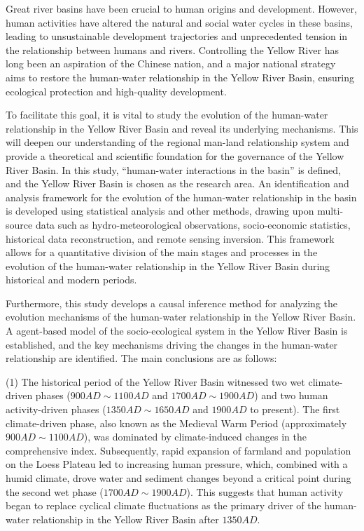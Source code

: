 \begin{eabstract}
  Great river basins have been crucial to human origins and development. However, human activities have altered the natural and social water cycles in these basins, leading to unsustainable development trajectories and unprecedented tension in the relationship between humans and rivers. Controlling the Yellow River has long been an aspiration of the Chinese nation, and a major national strategy aims to restore the human-water relationship in the Yellow River Basin, ensuring ecological protection and high-quality development.

  To facilitate this goal, it is vital to study the evolution of the human-water relationship in the Yellow River Basin and reveal its underlying mechanisms. This will deepen our understanding of the regional man-land relationship system and provide a theoretical and scientific foundation for the governance of the Yellow River Basin. In this study, ``human-water interactions in the basin'' is defined, and the Yellow River Basin is chosen as the research area. An identification and analysis framework for the evolution of the human-water relationship in the basin is developed using statistical analysis and other methods, drawing upon multi-source data such as hydro-meteorological observations, socio-economic statistics, historical data reconstruction, and remote sensing inversion. This framework allows for a quantitative division of the main stages and processes in the evolution of the human-water relationship in the Yellow River Basin during historical and modern periods.
  
  Furthermore, this study develops a causal inference method for analyzing the evolution mechanisms of the human-water relationship in the Yellow River Basin. A agent-based model of the socio-ecological system in the Yellow River Basin is established, and the key mechanisms driving the changes in the human-water relationship are identified. The main conclusions are as follows:

  (1) The historical period of the Yellow River Basin witnessed two wet climate-driven phases ($900 AD \sim 1100 AD$ and $1700 AD \sim 1900 AD$) and two human activity-driven phases ($1350 AD \sim 1650 AD$ and $1900 AD$ to present). The first climate-driven phase, also known as the Medieval Warm Period (approximately $900 AD \sim 1100 AD$), was dominated by climate-induced changes in the comprehensive index. Subsequently, rapid expansion of farmland and population on the Loess Plateau led to increasing human pressure, which, combined with a humid climate, drove water and sediment changes beyond a critical point during the second wet phase ($1700 AD \sim 1900 AD$). This suggests that human activity began to replace cyclical climate fluctuations as the primary driver of the human-water relationship in the Yellow River Basin after $1350 AD$.


\end{eabstract}
